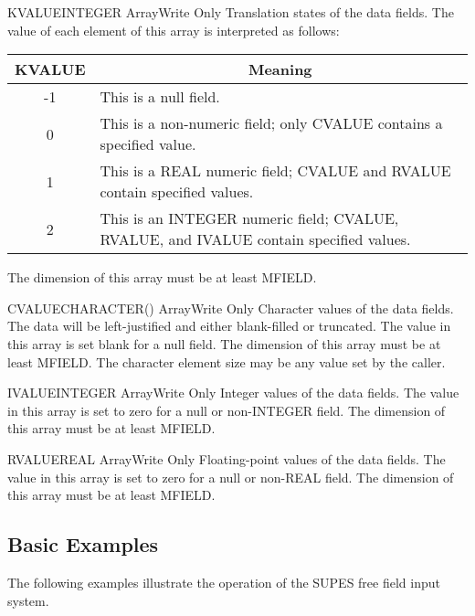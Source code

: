 \begin{argy}{KVALUE}{INTEGER Array}{Write Only}
Translation states of the data fields.  The value of
each element of this array is interpreted as follows:

\begin{tabular}{|cp{9 cm}|} \hline \hline
KVALUE & \multicolumn{1}{c|}{Meaning}\\ \hline
-1 & This is a null field.\\
0 & This is a non-numeric field; only CVALUE
contains a specified value.\\
1 & This is a REAL numeric field; CVALUE and
RVALUE contain specified values.\\
2 & This is an INTEGER numeric field; CVALUE,
RVALUE, and IVALUE contain specified values.\\ \hline \hline
\end{tabular}

The dimension of this array must be at least MFIELD.
\end{argy}

\begin{argy}{CVALUE}{CHARACTER\last(\last) Array}{Write Only}
Character values of the data fields.  The data will be
left-justified and either blank-filled or truncated.
The value in this array is set blank for a null field.
The dimension of this array must be at least MFIELD.
The character element size may be any value set by the
caller.
\end{argy}

\begin{argy}{IVALUE}{INTEGER Array}{Write Only}
Integer values of the data fields.  The value in this
array is set to zero for a null or non-INTEGER field.
The dimension of this array must be at least MFIELD.
\end{argy}

\begin{argy}{RVALUE}{REAL Array}{Write Only}
Floating-point values of the data fields.  The value in
this array is set to zero for a null or non-REAL field.
The dimension of this array must be at least MFIELD.
\end{argy}


\subsection{Basic Examples}

The following examples illustrate the operation of the SUPES free field
input system.

